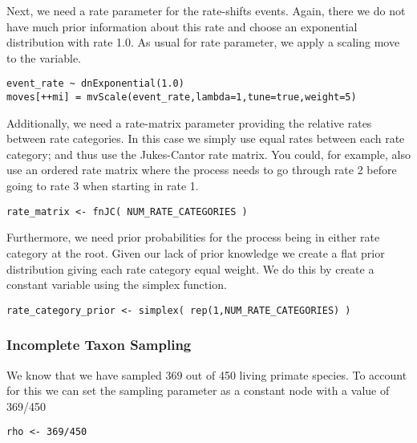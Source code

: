 Next, we need a rate parameter for the rate-shifts events.
Again, there we do not have much prior information about this rate and choose an exponential distribution with rate 1.0.
As usual for rate parameter, we apply a scaling move to the  variable.
{\tt \begin{snugshade*}
\begin{lstlisting}
event_rate ~ dnExponential(1.0)
moves[++mi] = mvScale(event_rate,lambda=1,tune=true,weight=5)
\end{lstlisting}
\end{snugshade*}}

Additionally, we need a rate-matrix parameter providing the relative rates between rate categories.
In this case we simply use equal rates between each rate category; and thus use the Jukes-Cantor rate matrix.
You could, for example, also use an ordered rate matrix where the process needs to go through rate 2 before going to rate 3 when starting in rate 1.
{\tt \begin{snugshade*}
\begin{lstlisting}
rate_matrix <- fnJC( NUM_RATE_CATEGORIES )
\end{lstlisting}
\end{snugshade*}}
Furthermore, we need prior probabilities for the process being in either rate category at the root.
Given our lack of prior knowledge we create a flat prior distribution giving each rate category equal weight.
We do this by create a constant variable using the simplex function.
{\tt \begin{snugshade*}
\begin{lstlisting}
rate_category_prior <- simplex( rep(1,NUM_RATE_CATEGORIES) )
\end{lstlisting}
\end{snugshade*}}



\subsubsection{Incomplete Taxon Sampling}

We know that we have sampled 369 out of 450 living primate species. 
To account for this we can set the sampling parameter as a constant node with a value of 369/450
{\tt \begin{snugshade*}
\begin{lstlisting}
rho <- 369/450
\end{lstlisting}
\end{snugshade*}}


